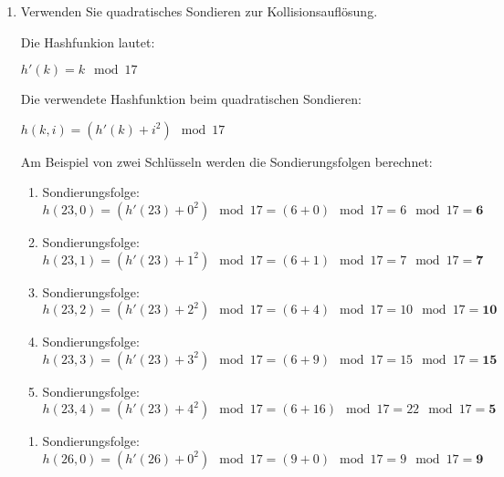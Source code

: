 \documentclass{lehramt-informatik-haupt}
\begin{document}
\begin{enumerate}
\begin{enumerate}

\item Verwenden Sie quadratisches Sondieren zur Kollisionsauflösung.

\begin{antwort}

\def\tmp#1{{\footnotesize#1}}

Die Hashfunkion lautet:

\tmp{$h'(k) = k \mod 17$}

Die verwendete Hashfunktion beim quadratischen Sondieren:

\tmp{$h(k, i) = (h'(k) + i^2) \mod 17$}

\bigskip

Am Beispiel von zwei Schlüsseln werden die Sondierungsfolgen berechnet:

\bigskip


\begin{enumerate}
\item Sondierungsfolge: \\
\tmp{$h(23, 0) = (h'(23) + 0^2) \mod 17 = (6 + 0) \mod 17 = 6 \mod 17 = \textbf{6}$}

\item Sondierungsfolge: \\
\tmp{$h(23, 1) = (h'(23) + 1^2) \mod 17 = (6 + 1) \mod 17 = 7 \mod 17 = \textbf{7}$}

\item Sondierungsfolge: \\
\tmp{$h(23, 2) = (h'(23) + 2^2) \mod 17 = (6 + 4) \mod 17 = 10 \mod 17 = \textbf{10}$}

\item Sondierungsfolge: \\
\tmp{$h(23, 3) = (h'(23) + 3^2) \mod 17 = (6 + 9) \mod 17 = 15 \mod 17 = \textbf{15}$}

\item Sondierungsfolge: \\
\tmp{$h(23, 4) = (h'(23) + 4^2) \mod 17 = (6 + 16) \mod 17 = 22 \mod 17 = \textbf{5}$}
\end{enumerate}

\bigskip


\begin{enumerate}
\item Sondierungsfolge: \\
\tmp{$h(26, 0) = (h'(26) + 0^2) \mod 17 = (9 + 0) \mod 17 = 9 \mod 17 = \textbf{9}$}


\end{enumerate}
\end{antwort}
\end{enumerate}
\end{enumerate}
\end{document}
